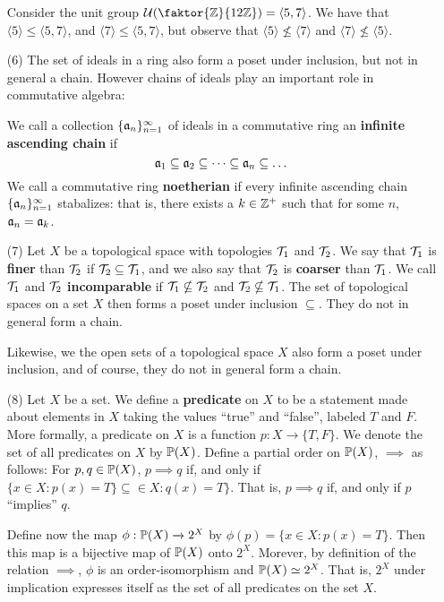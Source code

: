 \begin{example}
\begin{enumerate}
    Consider the unit group $\Uc(\faktor{\Z}{12\Z})=\langle 5,7
    \rangle$. We have that $\langle 5 \rangle \leq \langle 5,7
    \rangle$, and $\langle 7 \rangle \leq \langle 5,7 \rangle$, but
    observe that $\langle 5 \rangle \nleq \langle 7 \rangle$ and
    $\langle 7 \rangle \nleq \langle 5 \rangle$.

  \item[(6)] The set of ideals in a ring also form a poset under
    inclusion, but not in general a chain. However chains of ideals
    play an important role in commutative algebra:

    We call a collection $\{\mathfrak{a}_n\}_{n=1}^\infty$ of
    ideals in a commutative ring an \textbf{infinite ascending chain}
    if
    \begin{equation*}
      \mathfrak{a}_1 \subseteq \mathfrak{a}_2 \subseteq \dots \subseteq \mathfrak{a}_n \subseteq \dots
    \end{equation*}
    We call a commutative ring \textbf{noetherian} if every infinite
    ascending chain $\{\mathfrak{a}_n\}_{n=1}^\infty$ stabalizes: that is,
    there exists a $k \in \mathbb{Z}^+$ such that for some $n$, $\mathfrak{a}_n=\mathfrak{a}_k$.

  \item[(7)] Let $X$ be a topological space with topologies $\mathcal{T}_1$
    and $\mathcal{T}_2$. We say that $\mathcal{T}_1$ is \textbf{finer} than $\mathcal{T}_2$ if
    $\mathcal{T}_2 \subseteq \mathcal{T}_1$, and we also say that $\mathcal{T}_2$ is
    \textbf{coarser} than $\mathcal{T}_1$. We call $\mathcal{T}_1$ and $\mathcal{T}_2$
    \textbf{incomparable} if $\mathcal{T}_1 \nsubseteq \mathcal{T}_2$ and $\mathcal{T}_2
    \nsubseteq \mathcal{T}_1$. The set of topological spaces on a set $X$ then
    forms a poset under inclusion $\subseteq$. They do not in general
    form a chain.

    Likewise, we the open sets of a topological space $X$ also form a
    poset under inclusion, and of course, they do not in general form
    a chain.

  \item[(8)] Let $X$ be a set. We define a  \textbf{predicate} on $X$
    to be a statement made about elements in $X$ taking the values
    ``true'' and ``false'', labeled $T$ and $F$. More formally, a
    predicate on $X$ is a function  $p:X \xrightarrow{} \{T,F\}$. We
    denote the set of all predicates on $X$ by $\mathbb{P}(X)$. Define a
    partial order on $\mathbb{P}(X)$, $\implies$ as follows: For $p,q \in
    \mathbb{P}(X)$, $p \implies q$ if, and only if $\{x \in X : p(x)=T\}
  \subseteq \in X : q(x)=T\}$. That is, $p \implies q$ if, and only if
   $p$ ``implies'' $q$.

   Define now the map $\phi:\mathbb{P}(X) \xrightarrow{} 2^X$ by $\phi(p)=\{x
   \in X : p(x)=T\}$. Then this map is a bijective map of $\mathbb{P}(X)$
   onto $2^X$. Morever, by definition of the relation  $\implies$,
   $\phi$ is an order-isomorphism and  $\mathbb{P}(X) \simeq 2^X$. That is,
   $2^X$ under implication expresses itself as the set of all
   predicates on the set $X$.
  \end{enumerate}
\end{example}
